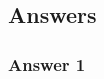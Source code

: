 \documentclass[a4paper, 12pt, english]{article}
\begin{document}
    \subsection{Answers}

    \subsubsection{Answer 1}

    \newpage



    \newpage
\printbibliography
\end{document}
